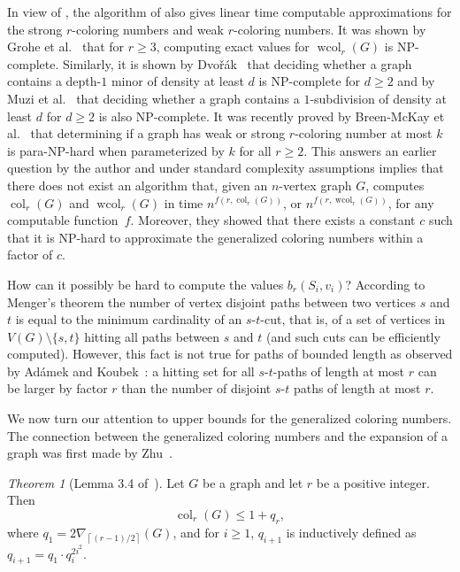 \documentclass[1p,number,a4paper]{elsarticle}
\theoremstyle{remark}
\DeclareMathOperator{\col}{col}
\DeclareMathOperator{\wcol}{wcol}
\newtheorem{theorem}{Theorem}[section]
\begin{document}
In view of , the algorithm of 
 also gives linear time computable 
approximations for
the strong $r$-coloring numbers and weak $r$-coloring numbers. 
It was shown by Grohe et al.~\cite{grohe2015colouring} that for $r\geq 3$, computing exact values for 
$\wcol_r(G)$ is NP-complete. Similarly, it is shown by Dvo\v{r}\'ak~\cite{dvovrak2007asymptotical} that deciding whether a graph contains a depth-$1$ minor of density at least $d$ is NP-complete for $d\geq 2$ and by Muzi et al.~\cite{MuziORS17} that deciding whether a graph contains a $1$-subdivision of density at least $d$ for $d\geq 2$ is also NP-complete.
It was recently proved by Breen{-}McKay et al.~\cite{BreenMcKayLS25} that determining if a
graph has weak or strong $r$-coloring number at most $k$ is para-NP-hard when parameterized by $k$
for all $r\geq 2$. 
This answers an earlier question by the author and under standard complexity assumptions implies that there does not exist an algorithm that, given an $n$-vertex graph $G$, computes $\col_r(G)$ and $\wcol_r(G)$ in time $n^{f(r,\col_r(G))}$, 
or $n^{f(r,\wcol_r(G))}$, for any computable function~$f$. 
Moreover, they showed that there exists a constant $c$ such that it is NP-hard to
approximate the generalized coloring numbers within a factor of $c$.

How can it possibly be hard to compute the values $b_r(S_i,v_i)$? 
According to Menger's theorem the number of vertex disjoint paths between two vertices $s$ and $t$ is equal to the minimum cardinality of an $s$-$t$-cut, that is, of a set of vertices in $V(G)\setminus \{s,t\}$ hitting all paths between $s$ and $t$ (and such cuts can be efficiently computed). 
However, this fact is not true for
paths of bounded length as observed by Ad{\'a}mek and Koubek~\cite{adamek1971remarks}: a hitting set for all $s$-$t$-paths of length at most $r$ can be larger by factor $r$ than the number of disjoint $s$-$t$ paths of length at most $r$. 

\medskip
We now turn our attention to upper bounds for the 
generalized coloring numbers. The connection between 
the generalized coloring numbers and the expansion of 
a graph was first made by Zhu~\cite{zhu2009colouring}.


\begin{theorem}[Lemma 3.4 of~\cite{zhu2009colouring}] 
Let $G$ be a graph and let $r$ be a positive integer.  Then 
\begin{equation*}
  \col_r(G)\leq 1+q_r,
\end{equation*}
where $q_1=2\nabla_{\left\lceil (r-1)/2\right\rceil}(G)$, and for $i\geq 1$, $q_{i+1}$ is
inductively defined as $q_{i+1}=q_1\cdot q_i^{2i^2}$.
\end{theorem}
\end{document}
